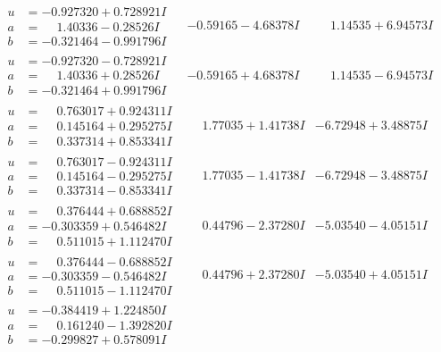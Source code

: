 \documentclass[1p]{elsarticle_modified}
\theoremstyle{definition}
\begin{document}
$$\begin{array}{c|c|c}
\begin{aligned}
u &= -0.927320 + 0.728921 I \\
a &= \phantom{-}1.40336 - 0.28526 I \\
b &= -0.321464 - 0.991796 I\end{aligned}
 & -0.59165 - 4.68378 I & \phantom{-}1.14535 + 6.94573 I \\ \hline\begin{aligned}
u &= -0.927320 - 0.728921 I \\
a &= \phantom{-}1.40336 + 0.28526 I \\
b &= -0.321464 + 0.991796 I\end{aligned}
 & -0.59165 + 4.68378 I & \phantom{-}1.14535 - 6.94573 I \\ \hline\begin{aligned}
u &= \phantom{-}0.763017 + 0.924311 I \\
a &= \phantom{-}0.145164 + 0.295275 I \\
b &= \phantom{-}0.337314 + 0.853341 I\end{aligned}
 & \phantom{-}1.77035 + 1.41738 I & -6.72948 + 3.48875 I \\ \hline\begin{aligned}
u &= \phantom{-}0.763017 - 0.924311 I \\
a &= \phantom{-}0.145164 - 0.295275 I \\
b &= \phantom{-}0.337314 - 0.853341 I\end{aligned}
 & \phantom{-}1.77035 - 1.41738 I & -6.72948 - 3.48875 I \\ \hline\begin{aligned}
u &= \phantom{-}0.376444 + 0.688852 I \\
a &= -0.303359 + 0.546482 I \\
b &= \phantom{-}0.511015 + 1.112470 I\end{aligned}
 & \phantom{-}0.44796 - 2.37280 I & -5.03540 - 4.05151 I \\ \hline\begin{aligned}
u &= \phantom{-}0.376444 - 0.688852 I \\
a &= -0.303359 - 0.546482 I \\
b &= \phantom{-}0.511015 - 1.112470 I\end{aligned}
 & \phantom{-}0.44796 + 2.37280 I & -5.03540 + 4.05151 I \\ \hline\begin{aligned}
u &= -0.384419 + 1.224850 I \\
a &= \phantom{-}0.161240 - 1.392820 I \\
b &= -0.299827 + 0.578091 I\end{aligned}

\end{array}$$
\end{document}
